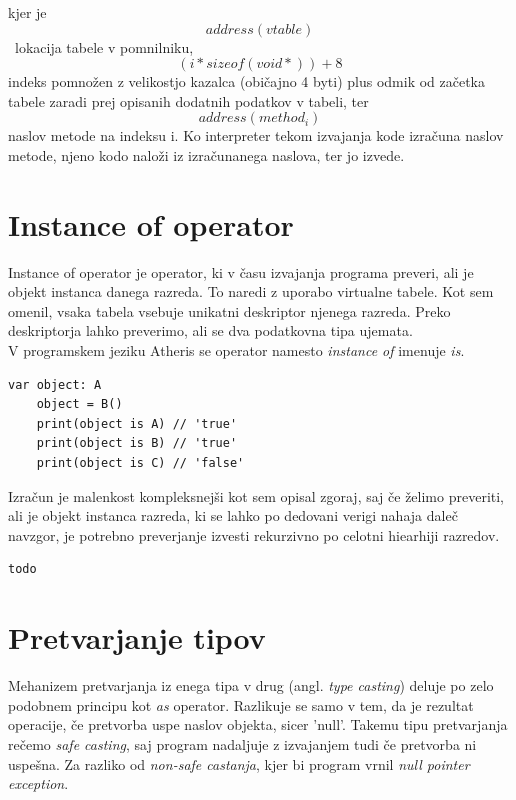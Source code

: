 \documentclass[a4paper, 12pt]{book}
\begin{document}
kjer je \[address(vtable)\]\ lokacija tabele v pomnilniku, \[(i * sizeof(void*)) + 8\] indeks pomnožen z velikostjo kazalca (običajno 4 byti) plus odmik od začetka tabele zaradi prej opisanih dodatnih podatkov v tabeli, ter \[ address(method_i)\] naslov metode na indeksu i. Ko interpreter tekom izvajanja kode izračuna naslov metode, njeno kodo naloži iz izračunanega naslova, ter jo izvede.
\newpage

\section{Instance of operator}

Instance of operator je operator, ki v času izvajanja programa preveri, ali je objekt instanca danega razreda. To naredi z uporabo virtualne tabele. Kot sem omenil, vsaka tabela vsebuje unikatni deskriptor njenega razreda. Preko deskriptorja lahko preverimo, ali se dva podatkovna tipa ujemata. \\
\indent V programskem jeziku Atheris se operator namesto \textit{instance of} imenuje \textit{is}.

\begin{lstlisting}[caption={Uporaba operatorja \textit{is} za razrede iz sheme ~\ref{vtables}}, captionpos=b]
	var object: A
	object = B()
	print(object is A) // 'true'
	print(object is B) // 'true'
	print(object is C) // 'false'
\end{lstlisting}

Izračun je malenkost kompleksnejši kot sem opisal zgoraj, saj če želimo preveriti, ali je objekt instanca razreda, ki se lahko po dedovani verigi nahaja daleč navzgor, je potrebno preverjanje izvesti rekurzivno po celotni hiearhiji razredov. \\

\begin{lstlisting}[caption={Algoritem za izračun ali je objekt instanca danega razeda}, captionpos=b]
todo
\end{lstlisting}


\section{Pretvarjanje tipov}

Mehanizem pretvarjanja iz enega tipa v drug (angl. \textit{type casting}) deluje po zelo podobnem principu kot \textit{as} operator. Razlikuje se samo v tem, da je rezultat operacije, če pretvorba uspe naslov objekta, sicer 'null'. Takemu tipu pretvarjanja rečemo \textit{safe casting}, saj program nadaljuje z izvajanjem tudi če pretvorba ni uspešna. Za razliko od \textit{non-safe castanja}, kjer bi program vrnil \textit{null pointer exception}.
\end{document}
